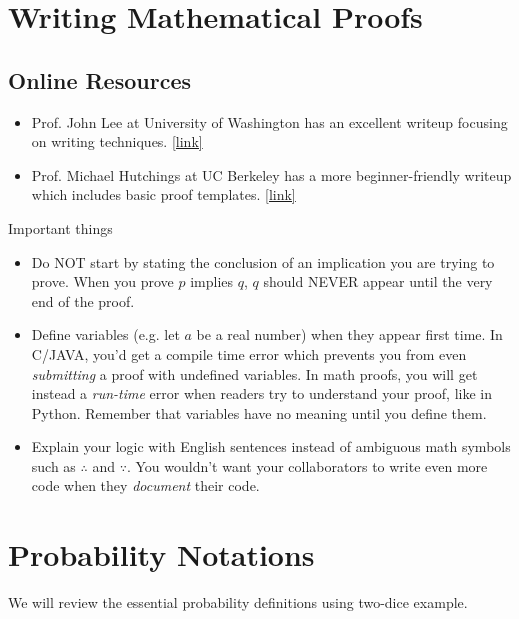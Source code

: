 \documentclass{discussion}
\begin{document}

\section{Writing Mathematical Proofs}

\subsection*{Online Resources}
\begin{itemize}
\item Prof. John Lee at University of Washington has an excellent writeup focusing on writing techniques. \href{https://www.math.washington.edu/~lee/Writing/writing-proofs.pdf}{[link]}
\item Prof. Michael Hutchings at UC Berkeley has a more beginner-friendly writeup which includes basic proof templates. \href{https://math.berkeley.edu/~hutching/teach/proofs.pdf}{[link]}
\end{itemize}

Important things
\begin{itemize}
\item Do NOT start by stating the conclusion of an implication you are trying to prove. When you  prove $p$ implies $q$, $q$ should NEVER appear until the very end of the proof.
\item Define variables (e.g. let $a$ be a real number) when they appear first time. In C/JAVA, you'd get a compile time error which prevents you from even \emph{submitting} a proof with undefined variables. In math proofs, you will get instead a \emph{run-time} error when readers try to understand your proof, like in Python. Remember that variables have no meaning until you define them.
\item Explain your logic with English sentences instead of ambiguous math symbols such as $\therefore$ and $\because$.  You wouldn't want your collaborators to write even more code when they \emph{document} their code.
\end{itemize}

\section{Probability Notations}
We will review the essential probability definitions using two-dice example.
\end{document}
